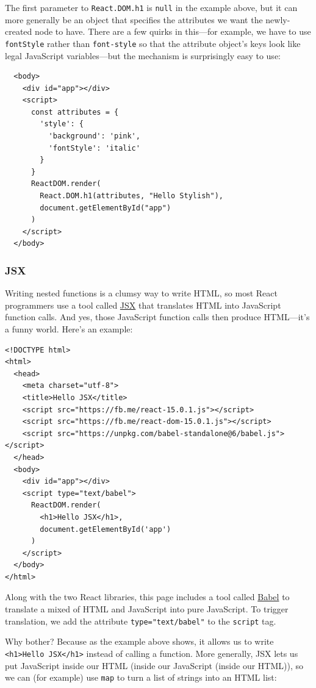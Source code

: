 The first parameter to \texttt{React.DOM.h1} is \texttt{null} in the
example above, but it can more generally be an object that specifies the
attributes we want the newly-created node to have. There are a few
quirks in this---for example, we have to use \texttt{fontStyle} rather
than \texttt{font-style} so that the attribute object's keys look like
legal JavaScript variables---but the mechanism is surprisingly easy to
use:

\begin{verbatim}
  <body>
    <div id="app"></div>
    <script>
      const attributes = {
        'style': {
          'background': 'pink',
          'fontStyle': 'italic'
        }
      }
      ReactDOM.render(
        React.DOM.h1(attributes, "Hello Stylish"),
        document.getElementById("app")
      )
    </script>
  </body>
\end{verbatim}

\subsubsection{JSX}\label{s:dynamic-jsx}

Writing nested functions is a clumsy way to write HTML, so most React
programmers use a tool called
\href{https://reactjs.org/docs/introducing-jsx.html}{JSX} that
translates HTML into JavaScript function calls. And yes, those
JavaScript function calls then produce HTML---it's a funny world. Here's
an example:

\begin{verbatim}
<!DOCTYPE html>
<html>
  <head>
    <meta charset="utf-8">
    <title>Hello JSX</title>
    <script src="https://fb.me/react-15.0.1.js"></script>
    <script src="https://fb.me/react-dom-15.0.1.js"></script>
    <script src="https://unpkg.com/babel-standalone@6/babel.js"></script>
  </head>
  <body>
    <div id="app"></div>
    <script type="text/babel">
      ReactDOM.render(
        <h1>Hello JSX</h1>,
        document.getElementById('app')
      )
    </script>
  </body>
</html>
\end{verbatim}

Along with the two React libraries, this page includes a tool called
\href{https://babeljs.io/}{Babel} to translate a mixed of HTML and
JavaScript into pure JavaScript. To trigger translation, we add the
attribute \texttt{type="text/babel"} to the \texttt{script} tag.

Why bother? Because as the example above shows, it allows us to write
\texttt{\textless{}h1\textgreater{}Hello\ JSX\textless{}/h1\textgreater{}}
instead of calling a function. More generally, JSX lets us put
JavaScript inside our HTML (inside our JavaScript (inside our HTML)), so
we can (for example) use \texttt{map} to turn a list of strings into an
HTML list:

